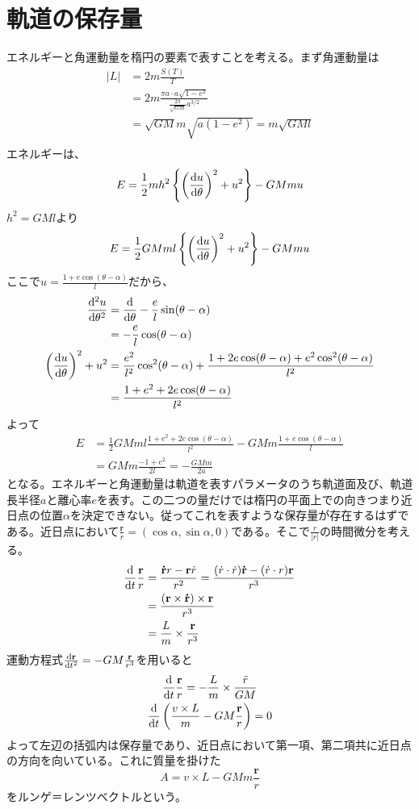 \section{軌道の保存量}
	エネルギーと角運動量を楕円の要素で表すことを考える。まず角運動量は
	\begin{align*}
		|L| &= 2m\frac{S(T)}{T}\\
		&= 2m\frac{\pi a\cdot a\sqrt{1-e^2}}{\frac{2\pi}{\sqrt{GM}}a^{3/2}}\\
		&= \sqrt{GM}m\sqrt{a(1-e^2)} = m\sqrt{GMl}\\
	\end{align*}
	エネルギーは、
		\[E = \frac{1}{2}mh^2\mlr{ \lr{\de[u]{\theta}}^2 + u^2 } - GMmu\]
	$h^2 = GMl$より
		\[E = \frac{1}{2}GMml\mlr{ \lr{\de[u]{\theta}}^2 + u^2 } - GMmu\]
	ここで$u = \frac{1 + e\cos(\theta - \alpha)}{l}$だから、
	\begin{align*}
		\de[^2u]{\theta^2} &= \de{\theta} - \frac{e}{l}\sin(\theta - \alpha)\\
        &= - \frac{e}{l}\cos(\theta - \alpha)\\
		\lr{\de[u]{\theta}}^2 + u^2
        &= \frac{e^2}{l^2}\cos^2(\theta - \alpha) + \frac{1 + 2e\cos(\theta - \alpha) + e^2\cos^2(\theta - \alpha)}{l^2}\\
		&= \frac{1 + e^2 + 2e\cos(\theta - \alpha)}{l^2}\\
	\end{align*}
	よって
	\begin{align*}
		E &= \frac{1}{2}GMml\frac{1 + e^2 + 2e\cos(\theta - \alpha)}{l^2} - GMm\frac{1 + e\cos(\theta - \alpha)}{l}\\
		&= GMm\frac{-1 + e^2}{2l} = - \frac{GMm}{2a}
	\end{align*}
	となる。エネルギーと角運動量は軌道を表すパラメータのうち軌道面及び、軌道長半径$a$と離心率$e$を表す。この二つの量だけでは楕円の平面上での向きつまり近日点の位置$\alpha$を決定できない。従ってこれを表すような保存量が存在するはずである。近日点において$\frac{\mathbf{r}}{r} = (\cos\alpha, \sin\alpha, 0)$である。そこで$\frac{r}{|r|}$の時間微分を考える。
	\begin{align*}
		\de{t}\frac{\mathbf{r}}{r} &= \frac{\mathbf{\dot{r}}{r} - \mathbf{r}\dot{r}}{r^2} = \frac{(\dot{r}\cdot\dot{r})\mathbf{\dot{r}} - (\dot{r}\cdot r)\mathbf{r}}{r^3}\\
		&= \frac{(\mathbf{r} \times \mathbf{\dot{r}}) \times \mathbf{r}}{r^3}\\
		&= \frac{L}{m}\times\frac{\mathbf{r}}{r^3}\\
	\end{align*}
	運動方程式$\de[\mathbf{r}]{t^2} = -GM\frac{\mathbf{r}}{r^3}$を用いると
	\begin{gather*}
		\de{t}\frac{\mathbf{r}}{r} = - \frac{L}{m}\times\frac{\ddot{r}}{GM}\\
		\de{t}\lr{ \frac{v\times L}{m} - GM\frac{\mathbf{r}}{r}} = 0\\
	\end{gather*}
	よって左辺の括弧内は保存量であり、近日点において第一項、第二項共に近日点の方向を向いている。これに質量を掛けた
		\[A = v\times L - GMm\frac{\mathbf{r}}{r}\]
	をルンゲ＝レンツベクトルという。

